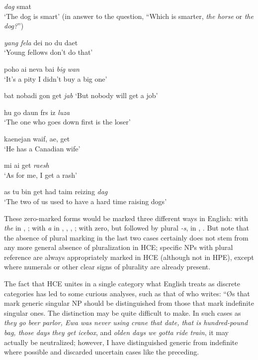 \ea\label{ex:36}
\textit{dag} smat\\
\glt `The dog is smart' (in answer to the question, ``Which is smarter, \textit{the horse} or \textit{the dog?}'')
\z

\ea\label{ex:37}
\textit{yang fela} dei no du daet \\
\glt `Young fellows don't do that'
\z


\ea\label{ex:38}
poho ai neva bai \textit{big} \textit{wan}\\
\glt `It's a pity I didn't buy a big one'
\z

\ea\label{ex:39}
bat nobadi gon get \textit{jab}
\glt `But nobody will get a job'
\z

\ea\label{ex:40}
hu go daun frs iz \textit{luza}\\
\glt `The one who goes down first is the loser'
\z

\ea\label{ex:41}
kaenejan waif, ae, get \\
\glt `He has a Canadian wife'
\glt 
\z

\ea\label{ex:42}
mi ai get \textit{raesh}\\
\glt `As for me, I get a rash'
\z

\ea\label{ex:43}
as tu bin get had taim reizing \textit{dag}\\
\glt `The two of us used to have a hard time raising dogs'
\z

These zero-marked forms would be marked three different ways in English: with \textit{the} in , ; with \textit{a} in , , , ; with zero, but followed by plural \textit{-s}, in , . But note that the absence of plural marking in the last two cases certainly does not stem from any more general absence of pluralization in HCE; specific NPs with plural reference are always appropriately marked in HCE (although not in HPE), except where numerals or other clear signs of plurality are already present.

The fact that HCE unites in a single category what English treats as discrete categories has led to some curious analyses, such as that of \citet[99]{Perlman1973} who writes: ``{\O}s that mark generic singular NP should be distinguished from those that mark indefinite singular ones. The distinction may be quite difficult to make. In such cases as \textit{they go beer parlor, Ewa was never using crane that date, that is hundred-pound bag, those days they get icebox}, and \textit{olden days we gotta ride train}, it may actually be neutralized; however, I have dis\-tinguished generic from indefinite where possible and discarded un\-certain cases like the preceding.{\textquotedbl}

